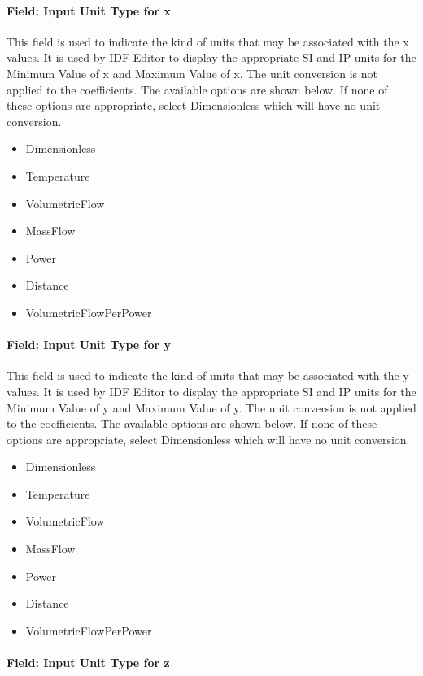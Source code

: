 \paragraph{Field: Input Unit Type for x}\label{field-input-unit-type-for-x-1}

This field is used to indicate the kind of units that may be associated with the x values. It is used by IDF Editor to display the appropriate SI and IP units for the Minimum Value of x and Maximum Value of x. The unit conversion is not applied to the coefficients. The available options are shown below. If none of these options are appropriate, select Dimensionless which will have no unit conversion.

\begin{itemize}
\item
  Dimensionless
\item
  Temperature
\item
  VolumetricFlow
\item
  MassFlow
\item
  Power
\item
  Distance
\item
  VolumetricFlowPerPower
\end{itemize}

\paragraph{Field: Input Unit Type for y}\label{field-input-unit-type-for-y}

This field is used to indicate the kind of units that may be associated with the y values. It is used by IDF Editor to display the appropriate SI and IP units for the Minimum Value of y and Maximum Value of y. The unit conversion is not applied to the coefficients. The available options are shown below. If none of these options are appropriate, select Dimensionless which will have no unit conversion.

\begin{itemize}
\item
  Dimensionless
\item
  Temperature
\item
  VolumetricFlow
\item
  MassFlow
\item
  Power
\item
  Distance
\item
  VolumetricFlowPerPower
\end{itemize}

\paragraph{Field: Input Unit Type for z}\label{field-input-unit-type-for-z}

